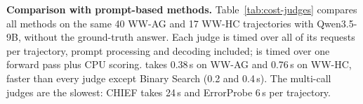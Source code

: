 %

\textbf{Comparison with prompt-based methods.}
Table~\ref{tab:cost-judges} compares all methods on the same 40 \textsc{WW-AG} and 17 \textsc{WW-HC} trajectories with Qwen3.5-9B, without the ground-truth answer. Each judge is timed over all of its requests per trajectory, prompt processing and decoding included; \soap{} is timed over one forward pass plus CPU scoring. \soap{} takes 0.38\,s on \textsc{WW-AG} and 0.76\,s on \textsc{WW-HC}, faster than every judge except Binary Search (0.2 and 0.4\,s). The multi-call judges are the slowest: CHIEF takes 24\,s and ErrorProbe 6\,s per trajectory.

